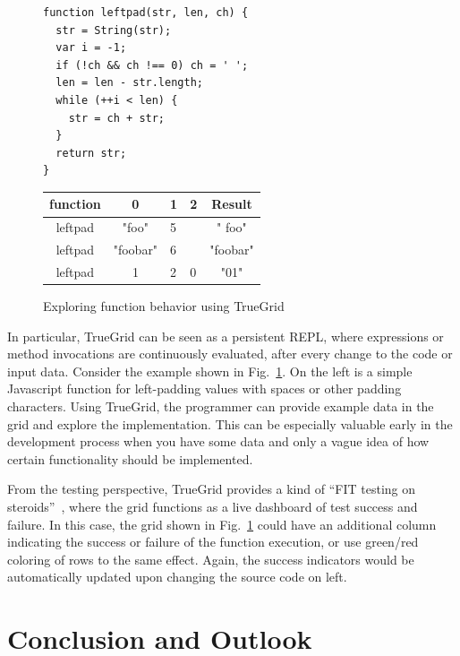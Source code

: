 \documentclass{llncs}
\begin{document}
\begin{figure}[t]
\begin{minipage}{0.6\linewidth}
\begin{lstlisting}
function leftpad(str, len, ch) {
  str = String(str);
  var i = -1;
  if (!ch && ch !== 0) ch = ' ';
  len = len - str.length;
  while (++i < len) {
    str = ch + str;
  }
  return str;
}
\end{lstlisting}
\end{minipage}
\begin{minipage}{0.4\linewidth}
\centering
\sffamily
\begin{tabular}{|c|c|m{0.5cm}|p{0.5cm}|c|}\hline
function & 0 & 1 & 2 & Result \\\hline\hline
leftpad & "foo" & 5 &  & "  foo" \\\hline
leftpad & "foobar" & 6 & & "foobar" \\\hline
leftpad & 1 & 2 & 0 & "01"\\\hline
\end{tabular}
\end{minipage}
\caption{Exploring function behavior using TrueGrid}
\label{FIG:leftpad}
\end{figure}

In particular, TrueGrid can be seen as a persistent REPL, where expressions or method invocations are continuously evaluated, after every change to the code or input data. 
Consider the example shown in Fig.~\ref{FIG:leftpad}.
On the left is a simple Javascript function for left-padding values with spaces or other padding characters. 
Using TrueGrid, the programmer can provide example data in the grid and explore the implementation. This can be especially valuable early in the development process when  you have some data and only a vague idea of how certain functionality should be implemented.

From the testing perspective, TrueGrid provides a kind of ``FIT testing on steroids''~\cite{mugridge2005fit}, where the grid functions as a live dashboard of test success and failure. 
In this case, the grid shown in Fig.~\ref{FIG:leftpad} could have an additional column indicating the success or failure of the function execution, or use green/red coloring of rows to the same effect.
Again, the success indicators would be automatically updated upon changing the source code on left. 


\section{Conclusion and Outlook}
\end{document}
